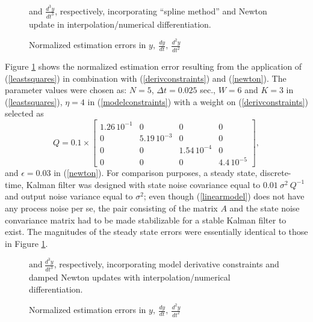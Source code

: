 \begin{figure}[hbt]
\centerline{}

\caption{\small Normalized estimation errors in \protect$y, \ \frac{dy}{dt}, \
\frac{d^2y}{dt^2}$} 
and  \protect$\frac{d^3y}{dt^3}$, respectively, incorporating 
``spline method'' and
Newton update in interpolation/numerical differentiation.
\label{figsinespline}
\end{figure}


Figure \ref{figsinespline} shows the normalized estimation error resulting
from the application of (\ref{leastsquares})  in combination with
(\ref{derivconstraints})
and (\ref{newton}).   The parameter values were chosen as: $N=5$, $\Delta t = 0.025$
sec., $W=6$ and $K=3$  in (\ref{leastsquares}), $\eta = 4$ in 
(\ref{modelconstraints}) with
a weight on (\ref{derivconstraints}) selected as
\begin{equation} Q = 0.1 \times
\left[ \begin{array}{cccc} 1.26 \, 10^{-1} & 0 & 0 & 0 \\
0  & 5.19 \, 10^{-3}  & 0 & 0 \\
0 & 0 & 1.54 \, 10^{-4} & 0 \\
0 & 0 & 0 & 4.4 \, 10^{-5} 
\end{array} \right],
\end{equation}
and $\epsilon = 0.03$ in (\ref{newton}).   
For comparison purposes,
a steady state, discrete-time, Kalman filter was designed with 
state noise covariance equal to 
$0.01 \ \sigma^2 \ Q^{-1}$ and output noise variance equal to $\sigma^2$; even
though (\ref{linearmodel}) does not have any process noise per se, the pair
consisting of the matrix $A$ and the state noise convariance matrix
had to be made stabilizable
for a stable Kalman filter to exist.
The magnitudes of the steady state errors were essentially identical to those in 
Figure \ref{figsinespline}.


\begin{figure}[hbt]
\centerline{}
\caption{\small Normalized estimation errors in $y, \ \frac{dy}{dt}, \
\frac{d^2y}{dt^2} \ $} 
$\mbox{and} \ \frac{d^3y}{dt^3}$, respectively, incorporating model derivative
constraints and damped Newton updates with 
interpolation/numerical differentiation.
\label{figsinemodel}
\end{figure}


